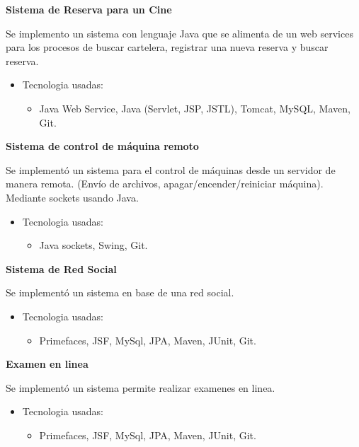 \documentclass[a4paper,12pt,final]{memoir}
\newcommand{\CVItem}[1]
	{\textbf{\color{RoyalBlue} #1}}
\begin{document}

\CVItem{Sistema de Reserva para un Cine}{
Se implemento un sistema con lenguaje Java que se alimenta de un web services
para los procesos de buscar cartelera, registrar una nueva reserva y buscar reserva.
\begin{itemize}[noitemsep]
  \item Tecnologia usadas:
  \begin{itemize}
    \item Java Web Service, Java (Servlet, JSP, JSTL), Tomcat, MySQL, Maven, Git.
  \end{itemize}
\end{itemize}
}


\CVItem{Sistema de control de máquina remoto}{
Se implementó un sistema para el control de máquinas desde un servidor de manera remota.
(Envío de archivos, apagar/encender/reiniciar máquina). Mediante sockets usando Java.
\begin{itemize}[noitemsep]
  \item Tecnologia usadas:
  \begin{itemize}
    \item Java sockets, Swing, Git.
  \end{itemize}
\end{itemize}
}


\CVItem{Sistema de Red Social}{
Se implementó un sistema en base de una red social.
\begin{itemize}[noitemsep]
  \item Tecnologia usadas:
  \begin{itemize}
    \item Primefaces, JSF, MySql, JPA, Maven, JUnit, Git.
  \end{itemize}
\end{itemize}
}


\CVItem{Examen en linea}{
Se implementó un sistema permite realizar examenes en linea.
\begin{itemize}[noitemsep]
  \item Tecnologia usadas:
  \begin{itemize}
    \item Primefaces, JSF, MySql, JPA, Maven, JUnit, Git.
  \end{itemize}
\end{itemize}
}
\end{document}
